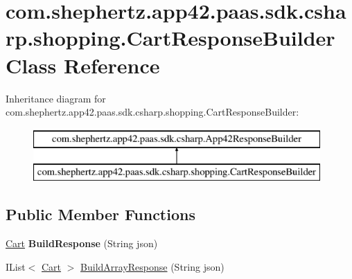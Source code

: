 \hypertarget{classcom_1_1shephertz_1_1app42_1_1paas_1_1sdk_1_1csharp_1_1shopping_1_1_cart_response_builder}{\section{com.\+shephertz.\+app42.\+paas.\+sdk.\+csharp.\+shopping.\+Cart\+Response\+Builder Class Reference}
\label{classcom_1_1shephertz_1_1app42_1_1paas_1_1sdk_1_1csharp_1_1shopping_1_1_cart_response_builder}
}
Inheritance diagram for com.\+shephertz.\+app42.\+paas.\+sdk.\+csharp.\+shopping.\+Cart\+Response\+Builder\+:\begin{figure}[H]
\begin{center}
\leavevmode
\includegraphics[height=2.000000cm]{classcom_1_1shephertz_1_1app42_1_1paas_1_1sdk_1_1csharp_1_1shopping_1_1_cart_response_builder}
\end{center}
\end{figure}
\subsection*{Public Member Functions}
\begin{DoxyCompactItemize}
\item 
\hypertarget{classcom_1_1shephertz_1_1app42_1_1paas_1_1sdk_1_1csharp_1_1shopping_1_1_cart_response_builder_a2f96f5c7bded6eca8bbd90ce3858650b}{\hyperlink{classcom_1_1shephertz_1_1app42_1_1paas_1_1sdk_1_1csharp_1_1shopping_1_1_cart}{Cart} {\bfseries Build\+Response} (String json)}\label{classcom_1_1shephertz_1_1app42_1_1paas_1_1sdk_1_1csharp_1_1shopping_1_1_cart_response_builder_a2f96f5c7bded6eca8bbd90ce3858650b}

\item 
I\+List$<$ \hyperlink{classcom_1_1shephertz_1_1app42_1_1paas_1_1sdk_1_1csharp_1_1shopping_1_1_cart}{Cart} $>$ \hyperlink{classcom_1_1shephertz_1_1app42_1_1paas_1_1sdk_1_1csharp_1_1shopping_1_1_cart_response_builder_a21d197124d8be62fa7accb8df9a0c3d9}{Build\+Array\+Response} (String json)
\end{DoxyCompactItemize}


